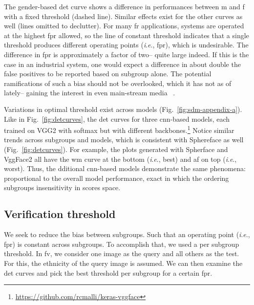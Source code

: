 \documentclass[10pt,twocolumn,letterpaper]{article}
\newcommand{\ie}{\textit{i}.\textit{e}., }
\begin{document}
The gender-based \gls{det} curve shows a difference in performances between \gls{m} and \gls{f} with a fixed threshold (dashed line). Similar effects exist for the other curves as well (lines omitted to declutter). For many \gls{fr} applications, systems are operated at the highest \gls{fpr} allowed, so the line of constant threshold indicates that a single threshold produces different operating points (\ie \gls{fpr}), which is undesirable.  The difference in \gls{fpr} is approximately a factor of two-- quite large indeed. If this is the case in an industrial system, one would expect a difference in about double the false positives to be reported based on subgroup alone. The potential ramifications of such a bias should not be overlooked, which it has not as of lately-- gaining the interest in even main-stream media ~\cite{england2019,snow2018}.

Variations in optimal threshold exist across models (Fig.~\ref{fig:sdm-appendix-a}). Like in Fig.~\ref{fig:detcurves}, the \gls{det} curves for three \gls{cnn}-based models, each trained on VGG2 with softmax but with different backbones.\footnote{\href{https://github.com/rcmalli/keras-vggface}{https://github.com/rcmalli/keras-vggface}} Notice similar trends across subgroups and models, which is consistent with  Sphereface as well (Fig.~\ref{fig:detcurves}). For example, the plots generated with Spherface and VggFace2 all have the \gls{wm} curve at the bottom (\ie best) and \gls{af} on top (\ie worst). Thus, the dditional \gls{cnn}-based models demonstrate the same phenomena: proportional to the overall model performance, exact in which the ordering subgroups insensitivity in scores space.

\subsection{Verification threshold} \label{subsec:analysis:verification}
We seek to reduce the bias between subgroups. Such that an operating point (\ie \gls{fpr}) is constant across subgroups. To accomplish that, we used a per subgroup threshold. In \gls{fv}, we consider one image as the query and all others as the test. For this, the ethnicity of the query image is assumed. We can then examine the \gls{det} curves and pick the best threshold per subgroup for a certain \gls{fpr}.
\end{document}
